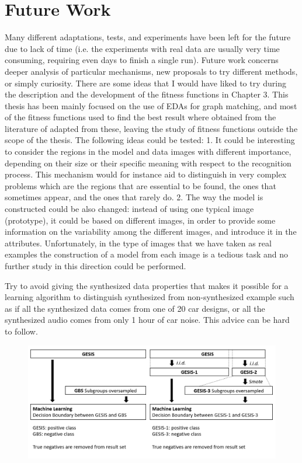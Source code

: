 \chapter{Future Work}\label{Sec:Future Work}

Many diﬀerent adaptations, tests, and experiments have been left for the future due to lack of time (i.e. the experiments with real data are usually very time consuming, requiring even days to ﬁnish a single run). Future work concerns deeper analysis of particular mechanisms, new proposals to try diﬀerent methods, or simply curiosity. There are some ideas that I would have liked to try during the description and the development of the ﬁtness functions in Chapter 3. This thesis has been mainly focused on the use of EDAs for graph matching, and most of the ﬁtness functions used to ﬁnd the best result where obtained from the literature of adapted from these, leaving the study of ﬁtness functions outside the scope of the thesis. The following ideas could be tested:
1. It could be interesting to consider the regions in the model and data images with diﬀerent importance, depending on their size or their speciﬁc meaning with respect to the recognition process. This mechanism would for instance aid to distinguish in very complex problems which are the regions that are essential to be found, the ones that sometimes appear, and the ones that rarely do.
2. The way the model is constructed could be also changed: instead of using one typical image (prototype), it could be based on diﬀerent images, in order to provide some information on the variability among the diﬀerent images, and introduce it in the attributes. Unfortunately, in the type of images that we have taken as real examples the construction of a model from each image is a tedious task and no further study in this direction could be performed.

Try to avoid giving the synthesized data properties that makes it possible for a learning algorithm to distinguish synthesized from non-synthesized example such as if all the synthesized data comes from one of 20 car designs, or all the synthesized audio comes from only 1 hour of car noise. This advice can be hard to follow. 

\begin{figure}[ht]
	\begin{center}
		\includegraphics[scale=0.52,angle=0]{fig/procedure}
		\label{std}
	\end{center}
\end{figure}

